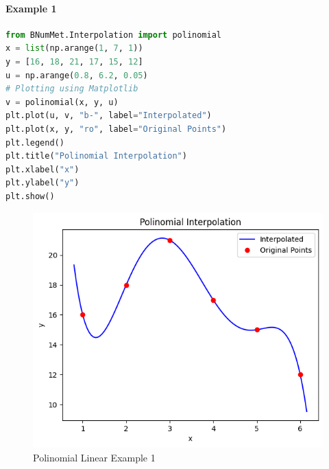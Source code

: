 \paragraph{Example 1}{
\begin{lstlisting}[language=Python]
from BNumMet.Interpolation import polinomial
x = list(np.arange(1, 7, 1))
y = [16, 18, 21, 17, 15, 12]
u = np.arange(0.8, 6.2, 0.05)
# Plotting using Matplotlib
v = polinomial(x, y, u)
plt.plot(u, v, "b-", label="Interpolated")
plt.plot(x, y, "ro", label="Original Points")
plt.legend()
plt.title("Polinomial Interpolation")
plt.xlabel("x")
plt.ylabel("y")
plt.show()
\end{lstlisting}
\begin{figure}[H]
    \centering
    \includegraphics{Include/Images/Thesis/Documentation/Interpolation/Polinomial Example 1.png}
    \caption{Polinomial Linear Example 1}
    \label{fig:Polinomial Linear Example 1}
\end{figure}
}